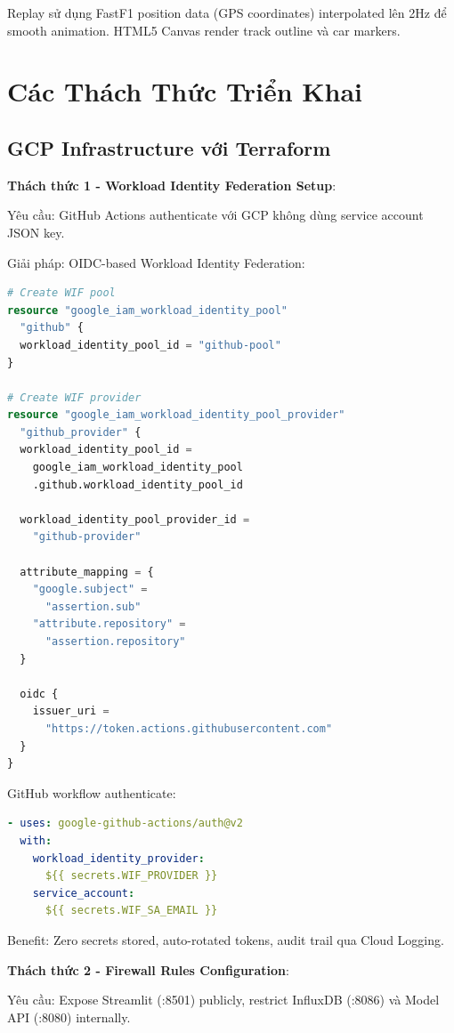 \documentclass[conference,10pt]{IEEEtran}
\begin{document}
Replay sử dụng FastF1 position data (GPS coordinates) interpolated lên 2Hz để smooth animation. HTML5 Canvas render track outline và car markers.

\section{Các Thách Thức Triển Khai}

\subsection{GCP Infrastructure với Terraform}

\textbf{Thách thức 1 - Workload Identity Federation Setup}:

Yêu cầu: GitHub Actions authenticate với GCP không dùng service account JSON key.

Giải pháp: OIDC-based Workload Identity Federation:

\begin{lstlisting}[language=terraform]
# Create WIF pool
resource "google_iam_workload_identity_pool"
  "github" {
  workload_identity_pool_id = "github-pool"
}

# Create WIF provider
resource "google_iam_workload_identity_pool_provider"
  "github_provider" {
  workload_identity_pool_id =
    google_iam_workload_identity_pool
    .github.workload_identity_pool_id

  workload_identity_pool_provider_id =
    "github-provider"

  attribute_mapping = {
    "google.subject" =
      "assertion.sub"
    "attribute.repository" =
      "assertion.repository"
  }

  oidc {
    issuer_uri =
      "https://token.actions.githubusercontent.com"
  }
}
\end{lstlisting}

GitHub workflow authenticate:
\begin{lstlisting}[language=yaml]
- uses: google-github-actions/auth@v2
  with:
    workload_identity_provider:
      ${{ secrets.WIF_PROVIDER }}
    service_account:
      ${{ secrets.WIF_SA_EMAIL }}
\end{lstlisting}

Benefit: Zero secrets stored, auto-rotated tokens, audit trail qua Cloud Logging.

\textbf{Thách thức 2 - Firewall Rules Configuration}:

Yêu cầu: Expose Streamlit (:8501) publicly, restrict InfluxDB (:8086) và Model API (:8080) internally.
\end{document}
